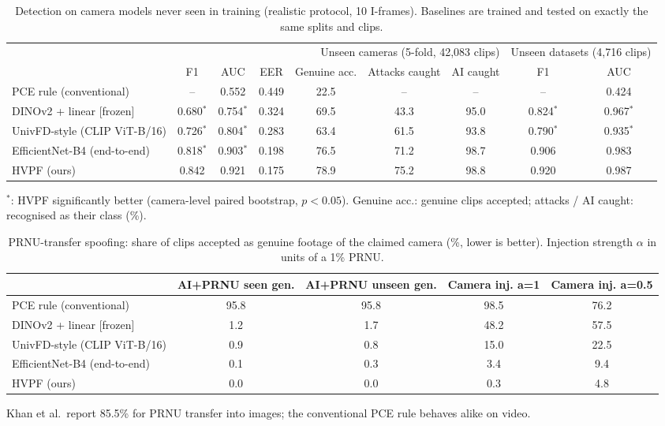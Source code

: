 \begin{table}[t]\centering\small\caption{Detection on camera models never seen in training (realistic protocol, 10 I-frames). Baselines are trained and tested on exactly the same splits and clips.}\label{tab:main}
\begin{tabular}{lcccccccc}
\toprule
 & \multicolumn{6}{r}{Unseen cameras (5-fold, 42,083 clips)} & \multicolumn{2}{r}{Unseen datasets (4,716 clips)} \\
 & F1 & AUC & EER & Genuine acc. & Attacks caught & AI caught & F1 & AUC \\
\midrule
PCE rule (conventional) & -- & 0.552 & 0.449 & 22.5 & -- & -- & -- & 0.424 \\
DINOv2 + linear [frozen] & 0.680$^{*}$ & 0.754$^{*}$ & 0.324 & 69.5 & 43.3 & 95.0 & 0.824$^{*}$ & 0.967$^{*}$ \\
UnivFD-style (CLIP ViT-B/16) & 0.726$^{*}$ & 0.804$^{*}$ & 0.283 & 63.4 & 61.5 & 93.8 & 0.790$^{*}$ & 0.935$^{*}$ \\
EfficientNet-B4 (end-to-end) & 0.818$^{*}$ & 0.903$^{*}$ & 0.198 & 76.5 & 71.2 & 98.7 & 0.906 & 0.983 \\
HVPF (ours) & 0.842 & 0.921 & 0.175 & 78.9 & 75.2 & 98.8 & 0.920 & 0.987 \\
\bottomrule
\end{tabular}
\par\footnotesize $^{*}$: HVPF significantly better (camera-level paired bootstrap, $p<0.05$). Genuine acc.: genuine clips accepted; attacks / AI caught: recognised as their class (\%).
\end{table}

\begin{table}[t]\centering\small\caption{PRNU-transfer spoofing: share of clips accepted as genuine footage of the claimed camera (\%, lower is better). Injection strength $\alpha$ in units of a 1\% PRNU.}\label{tab:spoof}
\begin{tabular}{lcccc}
\toprule
 & AI+PRNU seen gen. & AI+PRNU unseen gen. & Camera inj. a=1 & Camera inj. a=0.5 \\
\midrule
PCE rule (conventional) & 95.8 & 95.8 & 98.5 & 76.2 \\
DINOv2 + linear [frozen] & 1.2 & 1.7 & 48.2 & 57.5 \\
UnivFD-style (CLIP ViT-B/16) & 0.9 & 0.8 & 15.0 & 22.5 \\
EfficientNet-B4 (end-to-end) & 0.1 & 0.3 & 3.4 & 9.4 \\
HVPF (ours) & 0.0 & 0.0 & 0.3 & 4.8 \\
\bottomrule
\end{tabular}
\par\footnotesize Khan et al.\ report 85.5\% for PRNU transfer into images; the conventional PCE rule behaves alike on video.
\end{table}

